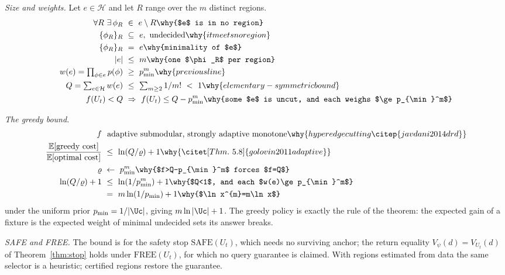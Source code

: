 \emph{Size and weights.} Let $e\in\mathcal H$ and let $R$ range over
the $m$ distinct regions.
\begin{align*}
\forall R\ \exists\,\phi_R\ &\in\ e\setminus R \why{$e$ is in no region}\\
\{\phi_R\}_R\ &\subseteq\ e,\ \text{undecided} \why{it meets no region}\\
\{\phi_R\}_R\ &=\ e \why{minimality of $e$}\\
|e|\ &\le\ m \why{one $\phi_R$ per region}\\
w(e)=\textstyle\prod_{\phi\in e}p(\phi)\ &\ge\ p_{\min}^{m} \why{previous line}\\
Q=\textstyle\sum_{e\in\mathcal H}w(e)\ &\le\ \textstyle\sum_{m\ge2}1/m!\ <\ 1
   \why{elementary-symmetric bound}\\
f(U_t)<Q\ &\Rightarrow\ f(U_t)\le Q-p_{\min}^{m}
   \why{some $e$ is uncut, and each weighs $\ge p_{\min}^m$}
\end{align*}

\emph{The greedy bound.}
\begin{align*}
f\ &\ \text{adaptive submodular, strongly adaptive monotone}
   \why{hyperedge cutting \citep{javdani2014drd}}\\
\frac{\mathbb E[\text{greedy cost}]}{\mathbb E[\text{optimal cost}]}\
   &\le\ \ln(Q/\varrho)+1
   \why{\citet[Thm.~5.8]{golovin2011adaptive}}\\
\varrho\ &\leftarrow\ p_{\min}^{m}
   \why{$f>Q-p_{\min}^m$ forces $f=Q$}\\
\ln(Q/\varrho)+1\ &\le\ \ln(1/p_{\min}^{m})+1
   \why{$Q<1$, and each $w(e)\ge p_{\min}^m$}\\
   &=\ m\ln(1/p_{\min})+1 \why{$\ln x^{m}=m\ln x$}
\end{align*}
under the uniform prior $p_{\min}=1/|\Uc|$, giving $m\ln|\Uc|+1$. The greedy policy is exactly the rule of the theorem:
the expected gain of a fixture is the expected weight of minimal undecided
sets its answer breaks.

\emph{SAFE and FREE.} The bound is for the safety stop $\mathrm{SAFE}(U_t)$, which needs no
surviving anchor; the return equality $V_\psi(d)=V_{U_t}(d)$ of Theorem~\ref{thm:stop} holds
under $\mathrm{FREE}(U_t)$, for which no query guarantee is claimed. With regions estimated from
data the same selector is a heuristic; certified regions restore the guarantee.

